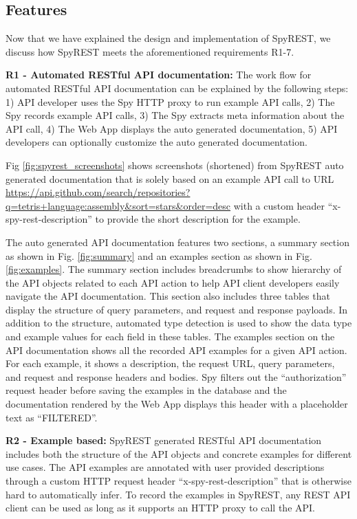 \subsection{Features} %

Now that we have explained the design and implementation of SpyREST, we discuss how SpyREST meets the aforementioned requirements R1-7.

\textbf{R1 - Automated RESTful API documentation:} The work flow for automated RESTful API documentation can be explained by the following steps: 1) API developer uses the Spy HTTP proxy to run example API calls, 2) The Spy records example API calls, 3) The Spy extracts meta information about the API call, 4) The Web App displays the auto generated documentation, 5) API developers can optionally customize the auto generated documentation.

Fig \ref{fig:spyrest_screenshots} shows screenshots (shortened) from SpyREST auto generated documentation that is solely based on an example API call to URL \url{https://api.github.com/search/repositories?q=tetris+language:assembly&sort=stars&order=desc} with a custom header ``x-spy-rest-description'' to provide the short description for the example.

The auto generated API documentation features two sections, a summary section as shown in Fig. \ref{fig:summary} and an examples section as shown in Fig. \ref{fig:examples}. The summary section includes breadcrumbs to show hierarchy of the API objects related to each API action to help API client developers easily navigate the API documentation. This section also includes three tables that display the structure of query parameters, and request and response payloads. In addition to the structure, automated type detection is used to show the data type and example values for each field in these tables. The examples section on the API documentation shows all the recorded API examples for a given API action. For each example, it shows a description, the request URL, query parameters, and request and response headers and bodies. Spy filters out the ``authorization'' request header before saving the examples in the database and the documentation rendered by the Web App displays this header with a placeholder text as ``FILTERED''.

\textbf{R2 - Example based:} SpyREST generated RESTful API documentation includes both the structure of the API objects and concrete examples for different use cases. The API examples are annotated with user provided descriptions through a custom HTTP request header ``x-spy-rest-description'' that is otherwise hard to automatically infer. To record the examples in SpyREST, any REST API client can be used as long as it supports an HTTP proxy to call the API.

